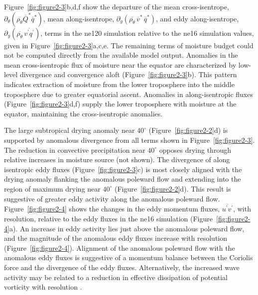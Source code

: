 Figure~\ref{fig:figure2-3}b,d,f show the departure of the mean cross-isentrope, $\partial_{\theta} (\overline{\rho_{\theta}} \overline{Q}^{\ast} \overline{q}^{\ast})$, mean along-isentrope, $\partial_y (\overline{\rho_{\theta}} \, \overline{v}^{\ast} \, \overline{q}^{\ast})$, and eddy along-isentrope, $\partial_y (\overline{\rho_{\theta}} \, \overline{v^{\prime} q^{\prime}})$, terms in the ne120 simulation relative to the ne16 simulation values, given in Figure~\ref{fig:figure2-3}a,c,e. The remaining terms of moisture budget could not be computed directly from the available model output. Anomalies in the mean cross-isentropic flux of moisture near the equator are characterized by low-level divergence and convergence aloft (Figure~\ref{fig:figure2-3}b). This pattern indicates extraction of moisture from the lower troposphere into the middle troposphere due to greater equatorial ascent. Anomalies in along-isentropic fluxes (Figure~\ref{fig:figure2-3}d,f) supply the lower troposphere with moisture at the equator, maintaining the cross-isentropic anomalies.

The large subtropical drying anomaly near $40^{\circ}$ (Figure~\ref{fig:figure2-2}d) is supported by anomalous divergence from all terms shown in Figure~\ref{fig:figure2-3}. The reduction in convective precipitation near $40^{\circ}$ opposes drying through relative increases in moisture source (not shown). The divergence of along isentropic eddy fluxes (Figure~\ref{fig:figure2-3}c) is most closely aligned with the drying anomaly flanking the anomalous poleward flow and extending into the region of maximum drying near $40^{\circ}$ (Figure~\ref{fig:figure2-2}d). This result is suggestive of greater eddy activity along the anomalous poleward flow. Figure~\ref{fig:figure2-4} shows the changes in the eddy momentum fluxes, $\overline{u^{\prime} v^{\prime}}$, with resolution, relative to the eddy fluxes in the ne16 simulation (Figure~\ref{fig:figure2-4}a). An increase in eddy activity lies just above the anomalous poleward flow, and the magnitude of the anomalous eddy fluxes increase with resolution (Figure~\ref{fig:figure2-4}). Alignment of the anomalous poleward flow with the anomalous eddy fluxes is suggestive of a momentum balance between the Coriolis force and the divergence of the eddy fluxes. Alternatively, the increased wave activity may be related to a reduction in effective dissipation of potential vorticity with resolution \citep{LETAL2015JCLIM}. 

